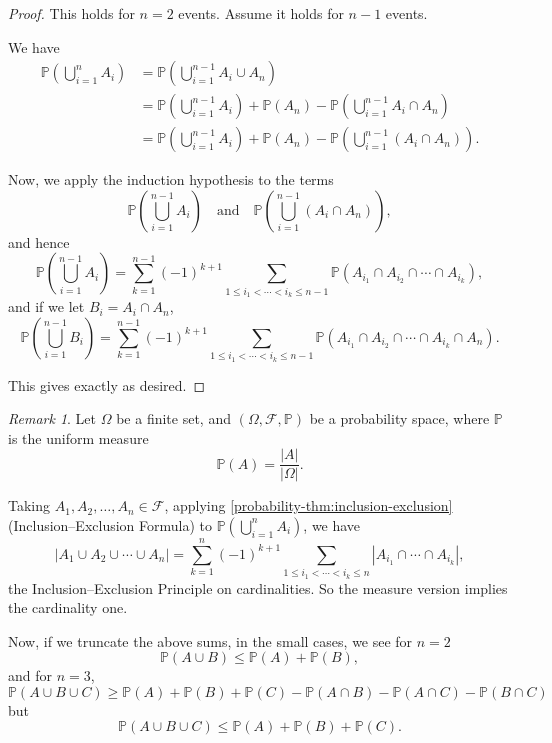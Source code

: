 \documentclass[11pt]{article}
\numberwithin{equation}{section}
\theoremstyle{definition}
\theoremstyle{remark}
\newtheorem{remark}[theorem]{Remark}
\newcommand{\pqty}[1]{\left(#1\right)}
\newcommand{\abs}[1]{\left|#1\right|}
\newcommand{\qand}{\quad\text{and}\quad}
\newcommand{\eventSpace}{\mathcal F}
\newcommand{\Prob}{\mathbb P}
\begin{document}
\begin{proof}\label{probability-proof-011}
    This holds for \(n = 2\) events. Assume it holds for \(n - 1\) events.

    We have
    \begin{align*}
        \Prob\pqty{\bigcup_{i = 1}^{n} A_i} &= \Prob\pqty{\bigcup_{i = 1}^{n - 1} A_i \cup A_n} \\
        &= \Prob\pqty{\bigcup_{i = 1}^{n - 1} A_i} + \Prob\pqty{A_n} - \Prob\pqty{\bigcup_{i = 1}^{n - 1} A_i \cap A_n} \\
        &= \Prob\pqty{\bigcup_{i = 1}^{n - 1} A_i} + \Prob\pqty{A_n} - \Prob\pqty{\bigcup_{i = 1}^{n - 1} \pqty{A_i \cap A_n}}.
    \end{align*}

    Now, we apply the induction hypothesis to the terms
    \[
        \Prob\pqty{\bigcup_{i = 1}^{n - 1} A_i} \qand \Prob\pqty{\bigcup_{i = 1}^{n - 1} \pqty{A_i \cap A_n}},
    \]
    and hence
    \[
        \Prob\pqty{\bigcup_{i = 1}^{n - 1} A_i} = \sum_{k = 1}^{n - 1} \pqty{-1}^{k + 1} \sum_{1 \leq i_1 < \cdots < i_k \leq n - 1} \Prob\pqty{A_{i_1} \cap A_{i_2} \cap \cdots \cap A_{i_k}},
    \]
    and if we let \(B_i = A_i \cap A_n\),
    \[
        \Prob\pqty{\bigcup_{i = 1}^{n - 1} B_i} = \sum_{k = 1}^{n - 1} \pqty{-1}^{k + 1} \sum_{1 \leq i_1 < \cdots < i_k \leq n - 1} \Prob\pqty{A_{i_1} \cap A_{i_2} \cap \cdots \cap A_{i_k} \cap A_n}.
    \]

    This gives exactly as desired.
\end{proof}

\begin{remark}\label{probability-remark-003}
    Let \(\Omega\) be a finite set, and \(\pqty{\Omega, \eventSpace, \Prob}\) be a probability space, where \(\Prob\) is the uniform measure
    \[
        \Prob\pqty{A} = \frac{\abs{A}}{\abs{\Omega}}.
    \]

    Taking \(A_1, A_2, \ldots, A_n \in \eventSpace\), applying \autoref{probability-thm:inclusion-exclusion} (Inclusion--Exclusion Formula) to \(\Prob\pqty{\bigcup_{i = 1}^{n} A_i}\), we have
    \[
        \abs{A_1 \cup A_2 \cup \cdots \cup A_n} = \sum_{k = 1}^{n} \pqty{-1}^{k + 1} \sum_{1 \leq i_1 < \cdots < i_k \leq n} \abs{A_{i_1} \cap \cdots \cap A_{i_k}},
    \]
    the Inclusion--Exclusion Principle on cardinalities. So the measure version implies the cardinality one.
\end{remark}

Now, if we truncate the above sums, in the small cases, we see for \(n = 2\)
\[
    \Prob\pqty{A \cup B} \leq \Prob\pqty{A} + \Prob\pqty{B},
\]
and for \(n = 3\),
\[
    \Prob\pqty{A \cup B \cup C} \geq \Prob\pqty{A} + \Prob\pqty{B} + \Prob\pqty{C} - \Prob\pqty{A \cap B} - \Prob\pqty{A \cap C} - \Prob\pqty{B \cap C}
\]
but
\[
    \Prob\pqty{A \cup B \cup C} \leq \Prob\pqty{A} + \Prob\pqty{B} + \Prob\pqty{C}.
\]
\end{document}
